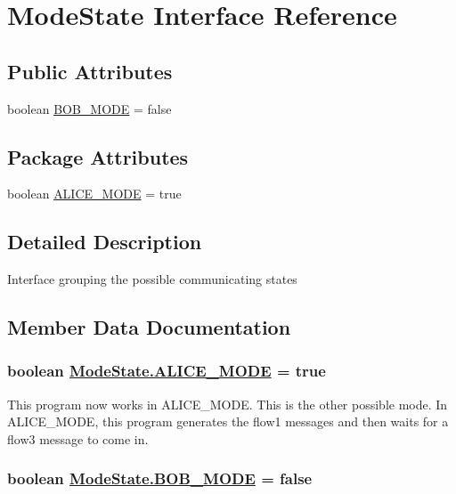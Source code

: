 \hypertarget{interface_mode_state}{
\section{Mode\-State Interface Reference}
\label{interface_mode_state}
}
\subsection*{Public Attributes}
\begin{CompactItemize}
\item 
boolean \hyperlink{interface_mode_state_o0}{BOB\_\-MODE} = false
\end{CompactItemize}
\subsection*{Package Attributes}
\begin{CompactItemize}
\item 
boolean \hyperlink{interface_mode_state_q0}{ALICE\_\-MODE} = true
\end{CompactItemize}


\subsection{Detailed Description}
Interface grouping the possible communicating states 



\subsection{Member Data Documentation}
\hypertarget{interface_mode_state_q0}{
\subsubsection[ALICE\_\-MODE]{\setlength{\rightskip}{0pt plus 5cm}boolean \hyperlink{interface_mode_state_q0}{Mode\-State.ALICE\_\-MODE} = true}}
\label{interface_mode_state_q0}


This program now works in ALICE\_\-MODE. This is the other possible mode. In ALICE\_\-MODE, this program generates the flow1 messages and then waits for a flow3 message to come in. \hypertarget{interface_mode_state_o0}{
\subsubsection[BOB\_\-MODE]{\setlength{\rightskip}{0pt plus 5cm}boolean \hyperlink{interface_mode_state_o0}{Mode\-State.BOB\_\-MODE} = false}}
\label{interface_mode_state_o0}



